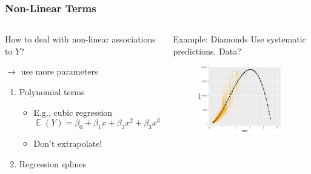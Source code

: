 \documentclass[
    utf8,
    aspectratio=169
]{beamer}  %
\DeclareMathOperator{\E}{\mathbb{E}}  %
\begin{document}
\begin{frame}
\frametitle{Non-Linear Terms}
\begin{columns}
	\begin{block}{How to deal with non-linear associations to $Y$?}
		
		$\rightarrow$ use more parameters
	\begin{enumerate}
		\item Polynomial terms
		\begin{itemize}
			\item E.g., cubic regression
			$$
				\E(Y) = \beta_0 + \beta_1 x + \beta_2 x^2 + \beta_3 x^3
			$$
			\item Don't extrapolate!
		\end{itemize}
		\item Regression splines
	\end{enumerate}
	\end{block}
	
	\begin{block}{Example: Diamonds}
		Use systematic predictions. Data?
		\begin{figure}
			\includegraphics[width=0.95\textwidth]{pics/nonlinear.pdf}
		\end{figure}
	\end{block}
\end{columns}
\end{frame}
\end{document}

